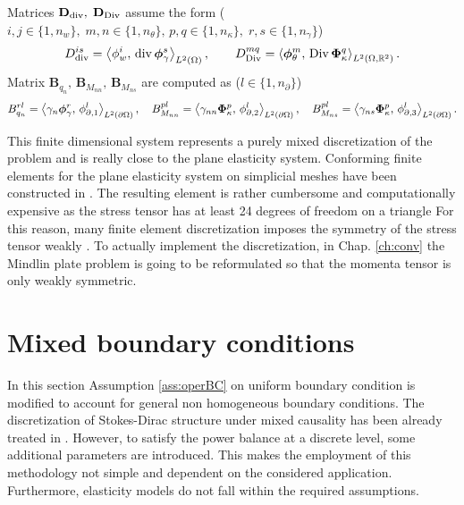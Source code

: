 Matrices $\mathbf{D}_{\div}, \; \mathbf{D}_{\Div}$ assume the form ($i, j \in \{1, n_w\}, \; m, n \in \{1, n_\theta\}, \, p, q \in \{1, n_\kappa\}, \; r, s \in \{1, n_\gamma\}$)
\begin{equation}
D_{\div}^{is} = \inner[L^2(\Omega)]{\phi_w^i}{\div \bm\phi_\gamma^s}, \qquad D_{\Div}^{mq} = \inner[L^2(\Omega, \mathbb{R}^2)]{\bm\phi_\theta^m}{\Div \bm\Phi_\kappa^q}.
\end{equation}
Matrix $\mathbf{B}_{q_n}, \, \mathbf{B}_{M_{nn}}, \, \mathbf{B}_{M_{ns}}$ are computed as ($l \in \{1, n_\partial\}$)
\begin{equation}
{B}_{q_n}^{rl} = \inner[L^2(\partial\Omega)]{\gamma_n \bm\phi_\gamma^r}{\phi_{\partial, 1}^l}, \quad {B}_{M_{nn}}^{pl} = \inner[L^2(\partial\Omega)]{\gamma_{nn} \bm\Phi_\kappa^p}{\phi_{\partial, 2}^l},  \quad {B}_{M_{ns}}^{pl} = \inner[L^2(\partial\Omega)]{\gamma_{ns} \bm\Phi_\kappa^p}{\phi_{\partial, 3}^l}.
\end{equation}

This finite dimensional system represents a purely mixed discretization of the problem and is really close to the plane elasticity system. Conforming finite elements for the plane elasticity system on simplicial meshes have been constructed in \cite{arnold2002mixed}. The resulting element is rather cumbersome and computationally expensive as the stress tensor has at least 24 degrees of freedom on a triangle  For this reason, many finite element discretization imposes the symmetry of the stress tensor weakly \cite{arnold2007mixed}. To actually implement the discretization, in Chap. \ref{ch:conv} the Mindlin plate problem is going to be reformulated so that the momenta tensor is only weakly symmetric. 


\section{Mixed boundary conditions}\label{sec:mixedbc}
In this section Assumption \ref{ass:operBC} on uniform boundary condition is modified to account for general non homogeneous boundary conditions. The discretization of Stokes-Dirac structure under mixed causality has been already treated in \cite{kotyczka2018weak}. However, to satisfy the power balance at a discrete level, some additional parameters are introduced. This makes the employment of this methodology not simple and dependent on the considered application. Furthermore, elasticity models do not fall within the required assumptions. \\

